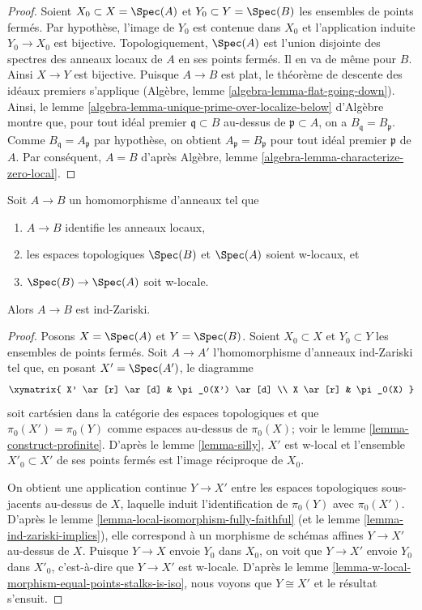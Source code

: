 \begin{proof}
Soient $X_0 \subset X = \Spec(A)$ et $Y_0 \subset Y = \Spec(B)$ les
ensembles de points ferm\'es. Par hypoth\`ese, l'image de $Y_0$ est contenue dans $X_0$ et
l'application induite $Y_0 \to X_0$ est bijective.
Topologiquement, $\Spec(A)$ est l'union disjointe des spectres
des anneaux locaux de $A$ en ses points ferm\'es.
Il en va de m\^eme pour $B$. Ainsi $X \to Y$ est bijective.
Puisque $A \to B$ est plat, le th\'eor\`eme de descente des id\'eaux premiers s'applique
(Alg\`ebre, lemme \ref{algebra-lemma-flat-going-down}).
Ainsi, le lemme \ref{algebra-lemma-unique-prime-over-localize-below} d'Alg\`ebre
montre que, pour tout id\'eal premier $\mathfrak q \subset B$ au-dessus de
$\mathfrak p \subset A$, on a $B_\mathfrak q = B_\mathfrak p$.
Comme $B_\mathfrak q = A_\mathfrak p$ par hypoth\`ese, on
obtient $A_\mathfrak p = B_\mathfrak p$ pour tout id\'eal premier $\mathfrak p$
de $A$. Par cons\'equent, $A = B$ d'apr\`es
Alg\`ebre, lemme \ref{algebra-lemma-characterize-zero-local}.
\end{proof}

\begin{lemma}
\label{lemma-w-local-morphism-equal-stalks-is-ind-zariski}
Soit $A \to B$ un homomorphisme d'anneaux tel que
\begin{enumerate}
\item $A \to B$ identifie les anneaux locaux,
\item les espaces topologiques $\Spec(B)$ et $\Spec(A)$ soient w-locaux, et
\item $\Spec(B) \to \Spec(A)$ soit w-locale.
\end{enumerate}
Alors $A \to B$ est ind-Zariski.
\end{lemma}

\begin{proof}
Posons $X = \Spec(A)$ et $Y = \Spec(B)$. Soient $X_0 \subset X$ et
$Y_0 \subset Y$ les ensembles de points ferm\'es. Soit $A \to A'$ l'homomorphisme d'anneaux ind-Zariski
tel que, en posant $X' = \Spec(A')$, le diagramme
$$
\xymatrix{
X' \ar[r] \ar[d] & \pi_0(X') \ar[d] \\
X \ar[r] & \pi_0(X)
}
$$
soit cart\'esien dans la cat\'egorie des espaces topologiques et que
$\pi_0(X') = \pi_0(Y)$ comme espaces au-dessus de $\pi_0(X)$; voir le
lemme \ref{lemma-construct-profinite}. D'apr\`es le
lemme \ref{lemma-silly}, $X'$ est w-local et
l'ensemble $X'_0 \subset X'$ de ses points ferm\'es est l'image r\'eciproque de $X_0$.

\medskip\noindent
On obtient une application continue $Y \to X'$ entre les espaces topologiques sous-jacents
au-dessus de $X$, laquelle induit l'identification de $\pi_0(Y)$ avec $\pi_0(X')$. D'apr\`es le
lemme \ref{lemma-local-isomorphism-fully-faithful}
(et le lemme \ref{lemma-ind-zariski-implies}),
elle correspond \`a un morphisme de sch\'emas affines $Y \to X'$
au-dessus de $X$. Puisque $Y \to X$ envoie $Y_0$ dans $X_0$, on voit que
$Y \to X'$ envoie $Y_0$ dans $X'_0$, c'est-à-dire que $Y \to X'$ est w-locale.
D'après le lemme \ref{lemma-w-local-morphism-equal-points-stalks-is-iso},
nous voyons que $Y \cong X'$ et le résultat s'ensuit.
\end{proof}


